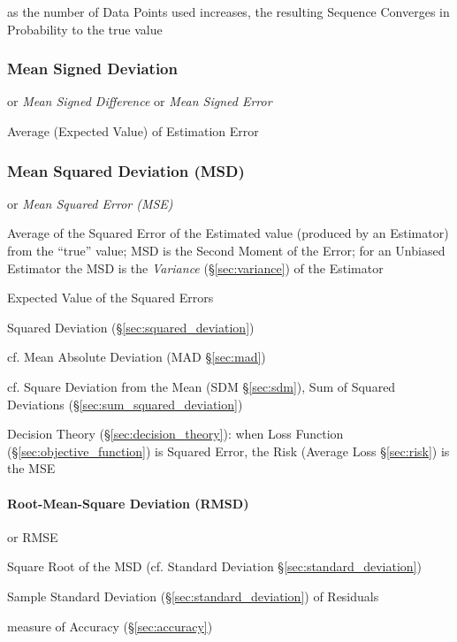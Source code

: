 as the number of Data Points used increases, the resulting Sequence Converges in
Probability to the true value



\subsubsection{Mean Signed Deviation}\label{sec:mean_signed_deviation}

or \emph{Mean Signed Difference} or \emph{Mean Signed Error}

Average (Expected Value) of Estimation Error



\subsubsection{Mean Squared Deviation (MSD)}\label{sec:msd}

or \emph{Mean Squared Error (MSE)}

Average of the Squared Error of the Estimated value (produced by an Estimator)
from the ``true'' value; MSD is the Second Moment of the Error; for an Unbiased
Estimator the MSD is the \emph{Variance} (\S\ref{sec:variance}) of the Estimator

Expected Value of the Squared Errors

Squared Deviation (\S\ref{sec:squared_deviation})

cf. Mean Absolute Deviation (MAD \S\ref{sec:mad})

cf. Square Deviation from the Mean (SDM \S\ref{sec:sdm}), Sum of Squared
Deviations (\S\ref{sec:sum_squared_deviation})

\fist Decision Theory (\S\ref{sec:decision_theory}): when Loss Function
(\S\ref{sec:objective_function}) is Squared Error, the Risk (Average Loss
\S\ref{sec:risk}) is the MSE



\paragraph{Root-Mean-Square Deviation (RMSD)}\label{sec:rmsd}\hfill

or RMSE

Square Root of the MSD (cf. Standard Deviation \S\ref{sec:standard_deviation})

Sample Standard Deviation (\S\ref{sec:standard_deviation}) of Residuals

measure of Accuracy (\S\ref{sec:accuracy})



